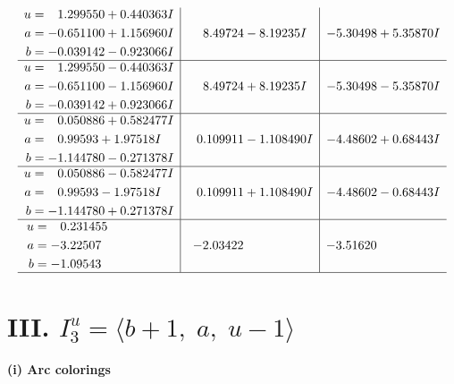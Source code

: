 \documentclass[1p]{elsarticle_modified}
\theoremstyle{definition}
\begin{document}
$$\begin{array}{c|c|c}
\begin{aligned}
u &= \phantom{-}1.299550 + 0.440363 I \\
a &= -0.651100 + 1.156960 I \\
b &= -0.039142 - 0.923066 I\end{aligned}
 & \phantom{-}8.49724 - 8.19235 I & -5.30498 + 5.35870 I \\ \hline\begin{aligned}
u &= \phantom{-}1.299550 - 0.440363 I \\
a &= -0.651100 - 1.156960 I \\
b &= -0.039142 + 0.923066 I\end{aligned}
 & \phantom{-}8.49724 + 8.19235 I & -5.30498 - 5.35870 I \\ \hline\begin{aligned}
u &= \phantom{-}0.050886 + 0.582477 I \\
a &= \phantom{-}0.99593 + 1.97518 I \\
b &= -1.144780 - 0.271378 I\end{aligned}
 & \phantom{-}0.109911 - 1.108490 I & -4.48602 + 0.68443 I \\ \hline\begin{aligned}
u &= \phantom{-}0.050886 - 0.582477 I \\
a &= \phantom{-}0.99593 - 1.97518 I \\
b &= -1.144780 + 0.271378 I\end{aligned}
 & \phantom{-}0.109911 + 1.108490 I & -4.48602 - 0.68443 I \\ \hline\begin{aligned}
u &= \phantom{-}0.231455\phantom{ +0.000000I} \\
a &= -3.22507\phantom{ +0.000000I} \\
b &= -1.09543\phantom{ +0.000000I}\end{aligned}
 & -2.03422\phantom{ +0.000000I} & -3.51620\phantom{ +0.000000I}\\
 \hline 
 \end{array}$$\newpage\newpage\renewcommand{\arraystretch}{1}
\centering \section*{III. $I^u_{3}= \langle b+1,\;a,\;u-1 \rangle$}
\flushleft \textbf{(i) Arc colorings}\\
\end{document}
